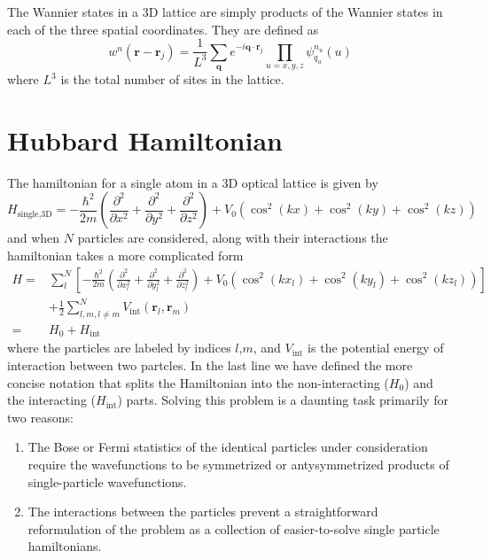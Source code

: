 \documentclass[11pt,letter]{article}
\newcommand{\bv}[1]{\ensuremath{\bm{#1}}}
\newcommand{\vo}{\ensuremath{V_{0}}}
\begin{document}
The Wannier states in a 3D lattice are simply products of the Wannier states in
each of the three spatial coordinates.  They are defined as 
\begin{equation}
 w^{n}(\bv{r}-\bv{r}_{j}) =  \frac{1}{L^{3}} \sum_{\bv{q}} e^{-i \bv{q}\cdot\bv{r}_{j} }
     \prod_{u=x,y,z}  \psi_{q_{u}}^{n_{u}}(u) 
 \label{eq:wannier3D}
\end{equation}
where $L^{3}$ is the total number of sites in the lattice. 

\section{Hubbard Hamiltonian}

The hamiltonian for a single atom in a 3D optical lattice is given by  
\begin{equation}
  H_{\text{single,3D}} = - \frac{\hbar^{2}}{2m} \left( \frac{\partial^{2}}{\partial x^{2}}
                            + \frac{\partial^{2}}{\partial y^{2}}
                            + \frac{\partial^{2}}{\partial z^{2}} \right)
 + \vo\left( \cos^{2}(kx)  + \cos^{2}(ky) + \cos^{2}(kz) \right)
\end{equation}
and when $N$ particles are considered, along with their interactions the
hamiltonian takes a more complicated form \begin{equation}
\begin{split}
  H = & \sum_{l}^{N}\left[ -\frac{\hbar^{2}}{2m} \left( \frac{\partial^{2}}{\partial x_{l}^{2}}
                            + \frac{\partial^{2}}{\partial y_{l}^{2}}
                            + \frac{\partial^{2}}{\partial z_{l}^{2}} \right)
 + \vo\left( \cos^{2}(kx_{l})  + \cos^{2}(ky_{l}) + \cos^{2}(kz_{l}) \right) \right]\\
      &  + \frac{1}{2}\sum_{ l,m, l\neq m}^{N} V_{\mathrm{int}}(\bv{r}_{l},\bv{r}_{m} )\\ 
    = & H_{0} + H_{\text{int}}
 \label{eq:hubbard1st}
\end{split} 
\end{equation} 
where the particles are labeled by indices $l$,$m$, and $V_{\mathrm{int}}$ is
the potential energy of interaction between two partcles.  In the last line we
have defined the more concise notation that splits the Hamiltonian into the
non-interacting ($H_{0}$) and the interacting ($H_{\text{int}}$) parts. Solving
this problem is a daunting task primarily for two reasons:
\begin{enumerate}
    \item The Bose or Fermi statistics of the identical particles under
consideration require the wavefunctions to be symmetrized or antysymmetrized
products of single-particle wavefunctions.     
    \item The interactions between the particles prevent a straightforward
reformulation of the problem as a collection of easier-to-solve single particle
hamiltonians.  
\end{enumerate}
\end{document}
